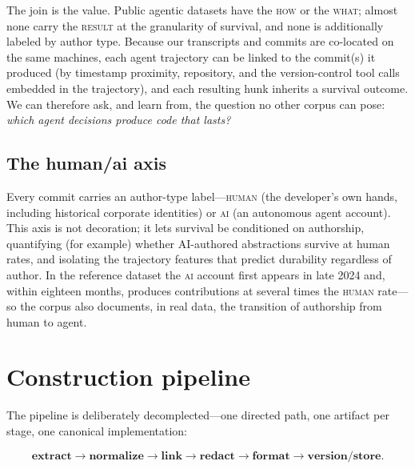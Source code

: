 \documentclass[11pt,letterpaper]{article}
\begin{document}
The join is the value. Public agentic datasets have the \textsc{how} or the
\textsc{what}; almost none carry the \textsc{result} at the granularity of
survival, and none is additionally labeled by author type. Because our
transcripts and commits are co-located on the same machines, each agent
trajectory can be linked to the commit(s) it produced (by timestamp proximity,
repository, and the version-control tool calls embedded in the trajectory), and
each resulting hunk inherits a survival outcome. We can therefore ask, and
learn from, the question no other corpus can pose: \emph{which agent decisions
produce code that lasts?}

\subsection{The human/ai axis}

Every commit carries an author-type label---\textsc{human} (the developer's own
hands, including historical corporate identities) or \textsc{ai} (an autonomous
agent account). This axis is not decoration; it lets survival be conditioned on
authorship, quantifying (for example) whether AI-authored abstractions survive
at human rates, and isolating the trajectory features that predict durability
regardless of author. In the reference dataset the \textsc{ai} account first
appears in late 2024 and, within eighteen months, produces contributions at
several times the \textsc{human} rate---so the corpus also documents, in real
data, the transition of authorship from human to agent.

\section{Construction pipeline}

The pipeline is deliberately decomplected---one directed path, one artifact per
stage, one canonical implementation:

\[
\textbf{extract} \to \textbf{normalize} \to \textbf{link} \to \textbf{redact}
\to \textbf{format} \to \textbf{version/store}.
\]
\end{document}
